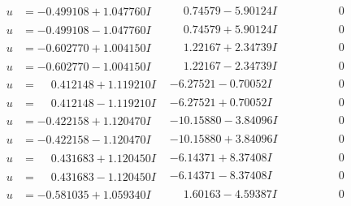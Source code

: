 \documentclass[1p]{elsarticle_modified}
\theoremstyle{definition}
\begin{document}
$$\begin{array}{c|c|c}
\begin{aligned}
u &= -0.499108 + 1.047760 I\end{aligned}
 & \phantom{-}0.74579 - 5.90124 I & \phantom{-0.000000 } 0 \\ \hline\begin{aligned}
u &= -0.499108 - 1.047760 I\end{aligned}
 & \phantom{-}0.74579 + 5.90124 I & \phantom{-0.000000 } 0 \\ \hline\begin{aligned}
u &= -0.602770 + 1.004150 I\end{aligned}
 & \phantom{-}1.22167 + 2.34739 I & \phantom{-0.000000 } 0 \\ \hline\begin{aligned}
u &= -0.602770 - 1.004150 I\end{aligned}
 & \phantom{-}1.22167 - 2.34739 I & \phantom{-0.000000 } 0 \\ \hline\begin{aligned}
u &= \phantom{-}0.412148 + 1.119210 I\end{aligned}
 & -6.27521 - 0.70052 I & \phantom{-0.000000 } 0 \\ \hline\begin{aligned}
u &= \phantom{-}0.412148 - 1.119210 I\end{aligned}
 & -6.27521 + 0.70052 I & \phantom{-0.000000 } 0 \\ \hline\begin{aligned}
u &= -0.422158 + 1.120470 I\end{aligned}
 & -10.15880 - 3.84096 I & \phantom{-0.000000 } 0 \\ \hline\begin{aligned}
u &= -0.422158 - 1.120470 I\end{aligned}
 & -10.15880 + 3.84096 I & \phantom{-0.000000 } 0 \\ \hline\begin{aligned}
u &= \phantom{-}0.431683 + 1.120450 I\end{aligned}
 & -6.14371 + 8.37408 I & \phantom{-0.000000 } 0 \\ \hline\begin{aligned}
u &= \phantom{-}0.431683 - 1.120450 I\end{aligned}
 & -6.14371 - 8.37408 I & \phantom{-0.000000 } 0 \\ \hline\begin{aligned}
u &= -0.581035 + 1.059340 I\end{aligned}
 & \phantom{-}1.60163 - 4.59387 I & \phantom{-0.000000 } 0 \\ \hline\begin{aligned}

\end{aligned}
\end{array}$$
\end{document}
